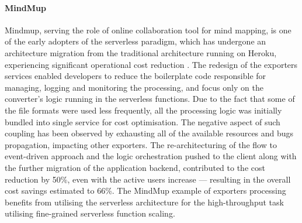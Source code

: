 

\paragraph*{MindMup}

Mindmup, serving the role of online collaboration tool for mind mapping, is one of the early adopters of the serverless paradigm, which has undergone an architecture migration from the traditional architecture running on Heroku, experiencing significant operational cost reduction \cite{ServerlessComputingEconomicAndArchitecturalImpact}.
The redesign of the exporters services enabled developers to reduce the boilerplate code responsible for managing, logging and monitoring the processing, and focus only on the converter's logic running in the serverless functions.
Due to the fact that some of the file formats were used less frequently, all the processing logic was initially bundled into single service for cost optimisation. The negative aspect of such coupling has been observed by exhausting all of the available resources and bugs propagation, impacting other exporters.
The re-architecturing of the flow to event-driven approach and the logic orchestration pushed to the client along with the further migration of the application backend, contributed to the cost reduction by 50\%, even with the active users increase --- resulting in the overall cost savings estimated to 66\%.
The MindMup example of exporters processing benefits from utilising the serverless architecture for the high-throughput task utilising fine-grained serverless function scaling.


